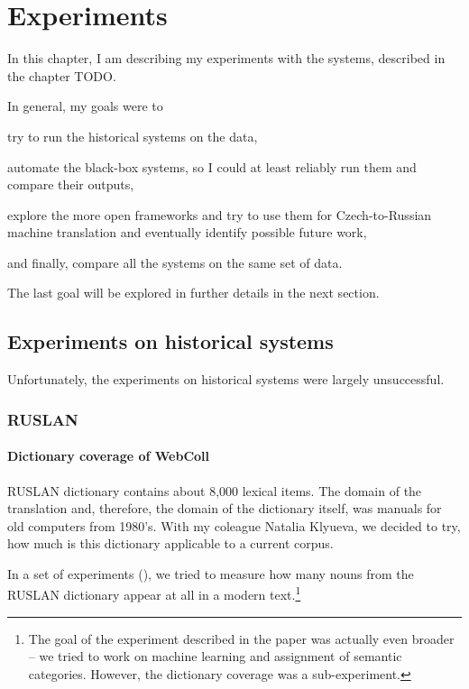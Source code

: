 \chapter{Experiments}
In this chapter, I am describing my experiments with the systems, described in the chapter TODO.

In general, my goals were to 
\begin{pitemize}
\item try to run the historical systems on the data,
\item automate the black-box systems, so I could at least reliably run them and compare their outputs,
\item explore the more open frameworks and try to use them for Czech-to-Russian machine translation and eventually identify possible future work,
\item and finally, compare all the systems on the same set of data.
\end{pitemize}

The last goal will be explored in further details in the next section.

\section{Experiments on historical systems}
Unfortunately, the experiments on historical systems were largely unsuccessful.

\subsection{RUSLAN}
\subsubsection{Dictionary coverage of WebColl}

RUSLAN dictionary contains about 8,000 lexical items. The domain of the translation and, therefore, the domain of the dictionary itself, was manuals for old computers from 1980's. 
With my coleague Natalia Klyueva, we decided to try, how much is this dictionary applicable to a current corpus.

In a set of experiments (\cite{florida}), we tried to measure how many nouns from the RUSLAN dictionary appear at all in a modern text.\footnote{The goal of the experiment described in the paper was actually even broader -- we tried to work on machine learning and assignment of semantic categories. However, the dictionary coverage was a sub-experiment.} 

